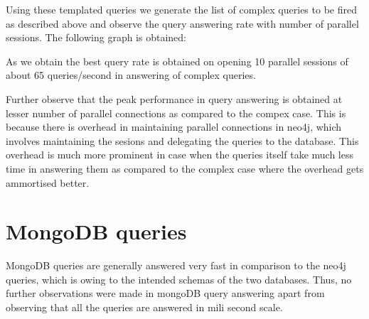 \documentclass[letterpaper,10pt,english]{sphinxmanual}
\begin{document}
\begin{sphinxVerbatim}[commandchars=\\\{\}]
  
\end{sphinxVerbatim}

Using these templated queries we generate the list of complex queries to be fired as described above and observe the query answering rate with number of parallel sessions. The following graph is obtained:

\noindent{}

As we obtain the best query rate is obtained on opening 10 parallel sessions of about 65 queries/second in answering of complex queries.

Further observe that the peak performance in query answering is obtained at lesser number of parallel connections as compared to the compex case. This is because there is overhead in maintaining parallel connections in neo4j, which involves maintaining the sesions and delegating the queries to the database. This overhead is much more prominent in case when the queries itself take much less time in answering them as compared to the complex case where the overhead gets ammortised better.


\section{MongoDB queries}
\label{\detokenize{benchmarking:mongodb-queries}}
MongoDB queries are generally answered very fast in comparison to the neo4j queries, which is owing to the intended schemas of the two databases. Thus, no further observations were made in mongoDB query answering apart from observing that all the queries are answered in mili second scale.
\end{document}
